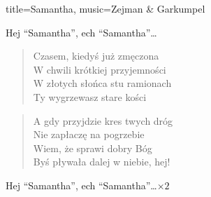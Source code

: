 \begin{song}{title={Samantha}, music={Zejman \& Garkumpel}}
\begin{multicols}{2}
\begin{chorus}
        Hej ``Samantha'', ech ``Samantha''\ldots
    \end{chorus}
    \begin{verse}
        Czasem, kiedyś już zmęczona \\
        W chwili krótkiej przyjemności \\
        W złotych słońca stu ramionach \\
        Ty wygrzewasz stare kości
    \end{verse}
    \begin{verse}
        A gdy przyjdzie kres twych dróg \\
        Nie zapłaczę na pogrzebie \\
        Wiem, że sprawi dobry Bóg \\
        Byś pływała dalej w niebie, hej!
    \end{verse}
    \begin{chorus}
        Hej ``Samantha'', ech ``Samantha''\ldots $\times 2$
    \end{chorus}
    \end{multicols}
\end{song}

